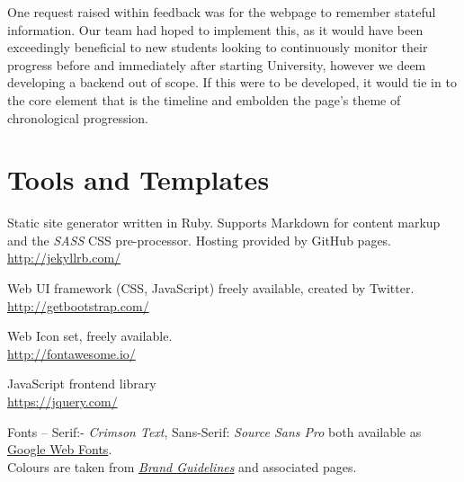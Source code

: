 \documentclass[a4paper, notoc]{tufte-handout}
\let\origdescription\description
\renewenvironment{description}{
  \setlength{\leftmargini}{1.5em}
  \origdescription
  \setlength{\itemindent}{-1.5em}
  \setlength{\labelsep}{\textwidth}
}
{\endlist}
\begin{document}
One request raised within feedback was for the webpage to remember stateful information. Our 
team had hoped to implement this, as it would have been exceedingly beneficial to new students 
looking to continuously monitor their progress before and immediately after starting University, 
however we deem developing a backend out of scope. If this were to be developed, it would tie 
in to the core element that is the timeline and embolden the page's theme of chronological progression.


\section{Tools and Templates}


\begin{description}

\item[Jekyll]
Static site generator written in Ruby. Supports Markdown for 
content markup and the \textit{SASS} CSS pre-processor.
Hosting provided by GitHub pages.
\\
\href{http://jekyllrb.com/}{http://jekyllrb.com/}

\item[BootStrap]
Web UI framework (CSS, JavaScript) freely available, created by Twitter.
\\
\href{http://getbootstrap.com/}{http://getbootstrap.com/}

\item[FontAwesome]
Web Icon set, freely available.
\\
\href{http://fontawesome.io/}{http://fontawesome.io/}


\item[JQuery]
JavaScript frontend library
\\
\href{https://jquery.com/}{https://jquery.com/}

\item[University of Edinburgh Style Guide]
Fonts -- Serif:- \textit{Crimson Text}, Sans-Serif: \textit{Source Sans Pro} both 
available as \href{https://fonts.google.com/}{Google Web Fonts}.
\\
Colours are taken from 
\href{http://www.ed.ac.uk/communications-marketing/resources}{\textit{Brand Guidelines}} 
and associated pages.
\\



\end{description}
\end{document}
